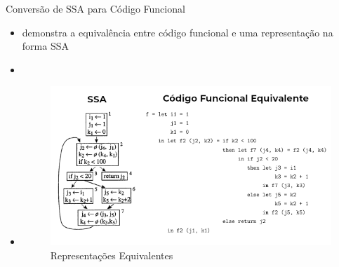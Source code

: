 \begin{frame}{Conversão de SSA para Código Funcional}
    \begin{itemize}
        \item {} demonstra a equivalência entre código funcional e uma representação na forma SSA

        \item []

        \item [] \begin{figure}
            \centering
            \includegraphics[width=.8\textwidth]{Figuras/ssa-funcional.png}
            \caption{Representações Equivalentes \cite{appel1998ssa}}
            \label{fig:conv1}
        \end{figure}
    \end{itemize}
\end{frame}